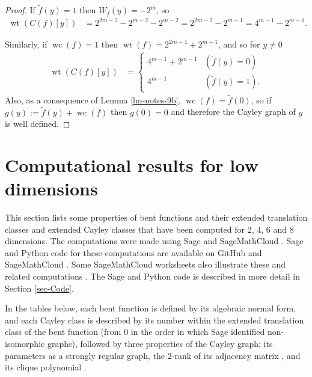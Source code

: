 \documentclass[12pt,a4paper]{article}
\newcommand{\dual}[1]{\widetilde{#1}}
\newcommand{\weight}[1]{\operatorname{wt}\left(#1\right)}
\newcommand{\weightclass}[1]{\operatorname{wc}\left(#1\right)}
\begin{document}
\begin{proof}
If $\dual{f}(y) = 1$ then $W_f(y) = -2^m$, so
\begin{align*}
\weight{C(f)[y]}
&=
2^{2m-2}-2^{m-2} - 2^{m-2}
=
2^{2m-2} - 2^{m-1}
=
4^{m-1} - 2^{m-1}.
\end{align*}

Similarly, if $\weightclass{f} = 1$ then $\weight{f} = 2^{2m-1}+2^{m-1}$,
and so for $y \neq 0$
\begin{align*}
\weight{C(f)[y]}
&=
\begin{cases}
4^{m-1} + 2^{m-1} & (\dual{f}(y)=0)
\\
4^{m-1}           & (\dual{f}(y)=1).
\end{cases}
\end{align*}
Also, as a consequence of Lemma \ref{lm-notes-9b}, $\weightclass{f} = \dual{f}(0)$,
so if $g(y) := \dual{f}(y) + \weightclass{f}$ then $g(0)=0$ and therefore the Cayley graph of $g$
is well defined.
\end{proof}


\section{Computational results for low dimensions}
\label{sec-Empirical}
This section lists some properties of bent functions and their extended translation classes and extended Cayley classes
that have been computed for 2, 4, 6 and 8 dimensions.
The computations were made using Sage \cite{SageMath7517} and SageMathCloud \cite{SageMathCloud}.
Sage and Python code for these computations are available on GitHub \cite{Leo16GitHub} and SageMathCloud \cite{Leo16SMC}.
Some SageMathCloud worksheets also illustrate these and related computations \cite{Leo16SMC}.
The Sage and Python code is described in more detail in Section \ref{sec-Code}.

In the tables below, each bent function is defined by its algebraic normal form, and each Cayley class is described by
its number within the extended translation class of the bent function (from 0 in the order in which Sage identified non-isomorphic graphs),
followed by three properties of the Cayley graph: its parameters as a strongly regular graph, the 2-rank of its adjacency matrix \cite{Brov92},
and its clique polynomial \cite{HoeL94}.

\end{document}
